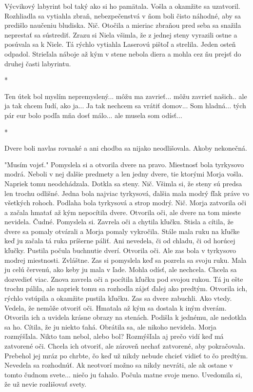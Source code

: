 \documentclass{book}
\begin{document}
Výcvikový labyrint bol taký ako si ho pamätala. Vošla a okamžite sa uzatvoril. Rozhliadla sa vytiahla zbraň, nebezpečenstvá v ňom boli čisto náhodné, aby sa predišlo naučeniu bludiska. Nič. Otočila a mieriac zbraňou pred seba sa snažila neprestať sa sústrediť. Zrazu si Niela všimla, že z jednej steny vyrazili ostne a posúvala sa k Niele. Tá rýchlo vytiahla Laserovú pištoľ a strelila. Jeden osteň odpadol. Strieľala náboje až kým v stene nebola diera a mohla cez ňu prejsť do druhej časti labyrintu.

\begin{center}
*
\end{center}

Ten útek bol myslím nepremyslený... môžu ma zavrieť... môžu zavrieť našich.. ale ja tak chcem ľudí, ako ja... Ja tak nechcem sa vrátiť domov... Som hladná... tých pár eur bolo podľa mňa dosť málo... ale musela som odísť...

\begin{center}
*
\end{center}

Dvere boli navlas rovnaké a ani chodba sa nijako neodlišovala. Akoby nekonečná.

"$ $Musím vojsť."$ $ Pomyslela si a otvorila dvere na pravo. Miestnosť bola tyrkysovo modrá. Neboli v nej ďalšie predmety a len jedny dvere, tie ktorými Morja vošla. Napriek tomu neodchádzala. Dotkla sa steny. Nič. Všimla si, že steny sú predsa len trochu odlišné. Jedna bola najviac tyrkysová, ďalšia mala modrý fľak práve vo všetkých rohoch. Podlaha bola tyrkysová a strop modrý. Nič. Morja zatvorila oči a začala hmatať až kým nepocítila dvere. Otvorila oči, ale dvere na tom mieste nevidela. Čudné. Pomyslela si. Zavrela oči a chytila kľučku. Stisla a cítila, že dvere sa pomaly otvárali a Morja pomaly vykročila. Stále mala ruku na kľučke keď ju začala tá ruka príšerne páliť. Ani nevedela, či od chladu, či od horúcej kľučky. Pustila počula buchnutie dverí. Otvorila oči. Ale zas bola v tyrkysovo modrej miestnosti. Zvláštne. Zas si pomyslela keď sa pozrela sa svoju ruku. Mala ju celú červenú, ako keby ju mala v ľade. Mohla odísť, ale nechcela. Chcela sa dozvedieť viac. Znova zavrela oči a pocítila kľučku pod svojou rukou. Tá ju ešte trochu pálila, ale napriek tomu sa rozhodla zájsť ďalej ako predtým. Otvorila ich, rýchlo vstúpila a okamžite pustila kľučku. Zas sa dvere zabuchli. Ako vtedy. Vedela, že nemôže otvoriť oči. Hmatala až kým sa dostala k iným dverám. Otvorila ich a uvidela krásne obrazy na stenách. Podišla k jednému, ale nedotkla sa ho. Cítila, že ju niekto ťahá. Obrátila sa, ale nikoho nevidela. Morja rozmýšľala. Nikto tam nebol, alebo bol? Rozmýšľala aj prečo vidí keď má zatvorené oči. Chcela ich otvoriť, ale zároveň nechať zatvorené, aby pokračovala. Prebehol jej mráz po chrbte, čo keď už nikdy nebude chcieť vidieť to čo predtým. Nevedela sa rozhodnúť. Ak neotvorí možno sa nikdy nevráti, ale ak ostane v tomto čudnom svete... niečo ju ťahalo. Počula matne svoje meno. Uvedomila si, že už nevie rozlišovať svety.
\end{document}
